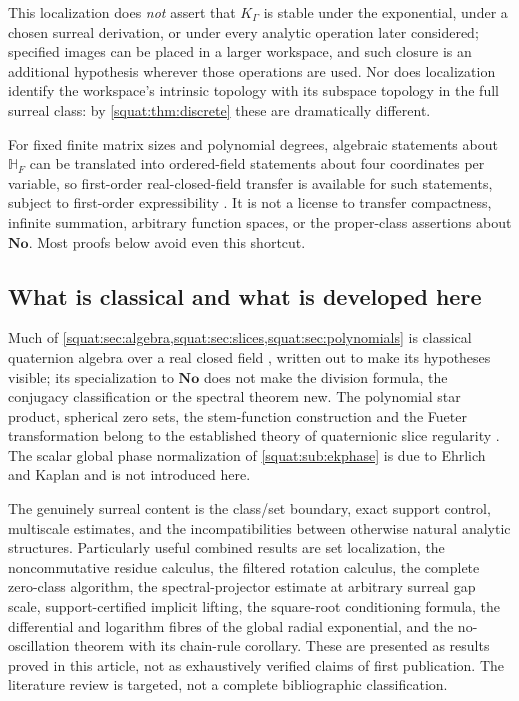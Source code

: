 \documentclass[11pt,letterpaper]{article}
\numberwithin{equation}{section}
\theoremstyle{definition}
\theoremstyle{remark}
\newcommand{\No}{\mathbf{No}}
\newcommand{\HF}{\mathbb H_F}
\begin{document}
This localization does \emph{not} assert that $K_\Gamma$ is stable under the
exponential, under a chosen surreal derivation, or under every analytic operation later
considered; specified images can be placed in a larger workspace, and such closure is an
additional hypothesis wherever those operations are used. Nor does localization identify
the workspace's intrinsic topology with its subspace topology in the full surreal class:
by \cref{squat:thm:discrete} these are dramatically different.

For fixed finite matrix sizes and polynomial degrees, algebraic statements about $\HF$
can be translated into ordered-field statements about four coordinates per variable, so
first-order real-closed-field transfer is available for such statements, subject to
first-order expressibility \cite{Swan}. It is not a license to transfer compactness,
infinite summation, arbitrary function spaces, or the proper-class assertions about
$\No$. Most proofs below avoid even this shortcut.

\subsection{What is classical and what is developed here}\label{squat:sub:classical}
Much of \cref{squat:sec:algebra,squat:sec:slices,squat:sec:polynomials} is classical
quaternion algebra over a real closed field \cite{Voight}, written out to make its
hypotheses visible; its specialization to $\No$ does not make the division formula, the
conjugacy classification or the spectral theorem new. The polynomial star product,
spherical zero sets, the stem-function construction and the Fueter transformation belong
to the established theory of quaternionic slice regularity \cite{GP}. The scalar global
phase normalization of \cref{squat:sub:ekphase} is due to Ehrlich and Kaplan \cite{EK}
and is not introduced here.

The genuinely surreal content is the class/set boundary, exact support control,
multiscale estimates, and the incompatibilities between otherwise natural analytic
structures. Particularly useful combined results are set localization, the
noncommutative residue calculus, the filtered rotation calculus, the complete zero-class
algorithm, the spectral-projector estimate at arbitrary surreal gap scale,
support-certified implicit lifting, the square-root conditioning formula, the
differential and logarithm fibres of the global radial exponential, and the
no-oscillation theorem with its chain-rule corollary. These are presented as results
proved in this article, not as exhaustively verified claims of first publication. The
literature review is targeted, not a complete bibliographic classification.
\end{document}
